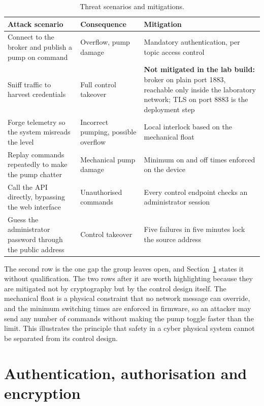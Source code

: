 \begin{table}[H]
\caption{Threat scenarios and mitigations.}
\label{tab:threat}
\centering
\renewcommand{\arraystretch}{1.1}
\begin{tabular}{|p{5.2cm}|p{3.4cm}|p{4.4cm}|}
\hline
\textbf{Attack scenario} & \textbf{Consequence} & \textbf{Mitigation} \\
\hline
Connect to the broker and publish a pump on command & Overflow, pump damage & Mandatory authentication, per topic access control \\
\hline
Sniff traffic to harvest credentials & Full control takeover & \textbf{Not mitigated in the lab build:} broker on plain port 1883, reachable only inside the laboratory network; TLS on port 8883 is the deployment step \\
\hline
Forge telemetry so the system misreads the level & Incorrect pumping, possible overflow & Local interlock based on the mechanical float \\
\hline
Replay commands repeatedly to make the pump chatter & Mechanical pump damage & Minimum on and off times enforced on the device \\
\hline
Call the API directly, bypassing the web interface & Unauthorised commands & Every control endpoint checks an administrator session \\
\hline
Guess the administrator password through the public address & Control takeover & Five failures in five minutes lock the source address \\
\hline
\end{tabular}
\end{table}

The second row is the one gap the group leaves open, and Section~\ref{sec:o7-2} states it without qualification. The two rows after it are worth highlighting because they are mitigated not by cryptography but by the control design itself. The mechanical float is a physical constraint that no network message can override, and the minimum switching times are enforced in firmware, so an attacker may send any number of commands without making the pump toggle faster than the limit. This illustrates the principle that safety in a cyber physical system cannot be separated from its control design.

\section{Authentication, authorisation and encryption}
\label{sec:o7-2}

